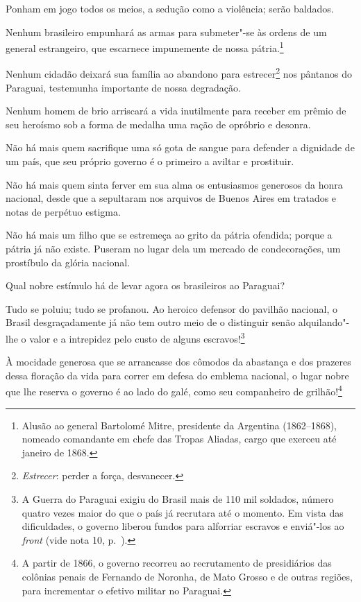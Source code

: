 \begin{linenumbers}
 Ponham em jogo todos os meios, a sedução como a violência; serão baldados.

 Nenhum brasileiro empunhará as armas para submeter"-se às ordens de um
general estrangeiro, que escarnece impunemente de nossa
pátria.\footnote{ Alusão ao general Bartolomé Mitre, presidente da Argentina (1862--1868),
nomeado comandante em chefe das Tropas Aliadas, cargo que exerceu até janeiro de 1868.}

 Nenhum cidadão deixará sua família ao abandono para
estrecer\footnote{ \textit{Estrecer}: perder a força, desvanecer.}
 nos pântanos do Paraguai, testemunha importante de nossa degradação.

 Nenhum homem de brio arriscará a vida inutilmente para receber em
prêmio de seu heroísmo sob a forma de medalha uma ração de opróbrio e desonra.

 Não há mais quem sacrifique uma só gota de sangue para defender a
dignidade de um país, que seu próprio governo é o primeiro a aviltar e prostituir.

 Não há mais quem sinta ferver em sua alma os entusiasmos generosos da
honra nacional, desde que a sepultaram nos arquivos de Buenos Aires em
tratados e notas de perpétuo estigma.

 Não há mais um filho que se estremeça ao grito da pátria ofendida;
porque a pátria já não existe. Puseram no lugar dela um mercado de
condecorações, um prostíbulo da glória nacional.

 Qual nobre estímulo há de levar agora os brasileiros ao Paraguai?

 Tudo se poluiu; tudo se profanou. Ao heroico defensor do pavilhão
nacional, o Brasil desgraçadamente já não tem outro meio de o
distinguir senão alquilando"-lhe o valor e a intrepidez pelo custo de
alguns escravos!\footnote{ A Guerra do Paraguai exigiu do Brasil mais de 
110 mil soldados, número quatro vezes maior do que o país já recrutara até o momento. 
Em vista das dificuldades, o governo liberou fundos para alforriar escravos 
e enviá"-los ao \textit{front} (vide nota 10, p.~\pageref{nota10}).} 

 À mocidade generosa que se arrancasse dos cômodos da abastança e dos
prazeres dessa floração da vida para correr em defesa do emblema
nacional, o lugar nobre que lhe reserva o governo é ao lado do galé,
como seu companheiro de grilhão!\footnote{ A partir de 1866, o governo recorreu ao 
recrutamento de presidiários das colônias penais de Fernando de Noronha, de Mato Grosso 
e de outras regiões, para incrementar o efetivo militar no Paraguai.}


\end{linenumbers}
